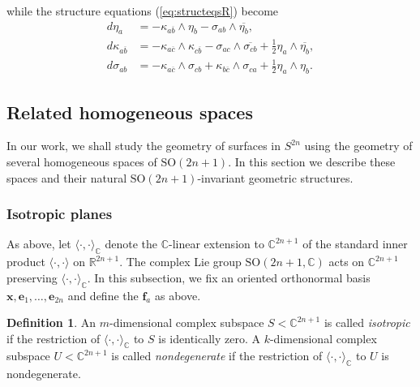 \documentclass[11pt]{article}
\theoremstyle{definition}
\newtheorem{definition}[theorem]{Definition}
\newcommand{\R}{\mathbb{R}}
\newcommand{\C}{\mathbb{C}}
\newcommand{\SO}{\mathrm{SO}}
\numberwithin{equation}{section}
\begin{document}
while the structure equations (\ref{eq:structeqsR}) become
\begin{equation}\label{eq:structeqsC}
	\begin{aligned}
		d \eta_a                  & = -\kappa_{a \overline{b}} \wedge \eta_b - \sigma_{ab} \wedge \overline{\eta_b},                                                                       \\
		d \kappa_{a \overline{b}} & = - \kappa_{a \overline{c}} \wedge \kappa_{c \overline{b}} - \sigma_{ac} \wedge \overline{\sigma_{cb}} + \tfrac{1}{2} \eta_a \wedge \overline{\eta_b}, \\
		d \sigma_{ab}             & = - \kappa_{a \overline{c}} \wedge \sigma_{cb} + \kappa_{b \overline{c}} \wedge \sigma_{ca} + \tfrac{1}{2} \eta_a \wedge \eta_b.                       
	\end{aligned}
\end{equation}
	
\subsection{Related homogeneous spaces}

In our work, we shall study the geometry of surfaces in $S^{2n}$ using the geometry of several homogeneous spaces of $\SO(2n+1).$ In this section we describe these spaces and their natural $\SO(2n+1)$-invariant geometric structures.

\subsubsection{Isotropic planes}

\indent \indent As above, let $\langle \cdot, \cdot \rangle_\C$ denote the $\C$-linear extension to $\C^{2n+1}$ of the standard inner product $\langle \cdot, \cdot \rangle$ on $\R^{2n+1}.$ The complex Lie group $\SO(2n+1, \C)$ acts on $\C^{2n+1}$ preserving $\langle \cdot, \cdot \rangle_\C.$ In this subsection, we fix an oriented orthonormal basis $\mathbf{x}, \mathbf{e}_1, \ldots, \mathbf{e}_{2n}$ and define the $\mathbf{f}_a$ as above.

\begin{definition}
	An $m$-dimensional complex subspace $S < \C^{2n+1}$ is called \emph{isotropic} if the restriction of $\langle \cdot, \cdot \rangle_\C$ to $S$ is identically zero. A $k$-dimensional complex subspace $U < \C^{2n+1}$ is called \emph{nondegenerate} if the restriction of $\langle \cdot, \cdot \rangle_\C$ to $U$ is nondegenerate.
\end{definition}
\end{document}
